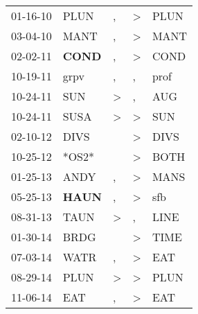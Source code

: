 \begin{supertabular}{p{0.07\textwidth}p{0.06\textwidth}p{0.02\textwidth}p{0.02\textwidth}p{0.06\textwidth}}
          01-16-10\textsuperscript{} &           PLUN\textsuperscript{} &             , &     \textgreater &           PLUN\textsuperscript{} \\
          03-04-10\textsuperscript{} &           MANT\textsuperscript{} &             , &     \textgreater &           MANT\textsuperscript{} \\
          02-02-11\textsuperscript{} &  \textbf{COND\textsuperscript{}} &             , &     \textgreater &           COND\textsuperscript{} \\
          10-19-11\textsuperscript{} &           grpv\textsuperscript{} &             , &                , &           prof\textsuperscript{} \\
          10-24-11\textsuperscript{} &            SUN\textsuperscript{} &  \textgreater &                , &            AUG\textsuperscript{} \\
          10-24-11\textsuperscript{} &           SUSA\textsuperscript{} &  \textgreater &     \textgreater &            SUN\textsuperscript{} \\
          02-10-12\textsuperscript{} &           DIVS\textsuperscript{} &               &     \textgreater &           DIVS\textsuperscript{} \\
          10-25-12\textsuperscript{} &                            *OS2* &               &     \textgreater &           BOTH\textsuperscript{} \\
          01-25-13\textsuperscript{} &           ANDY\textsuperscript{} &             , &     \textgreater &           MANS\textsuperscript{} \\
          05-25-13\textsuperscript{} &  \textbf{HAUN\textsuperscript{}} &             , &     \textgreater &            sfb\textsuperscript{} \\
          08-31-13\textsuperscript{} &           TAUN\textsuperscript{} &  \textgreater &                , &           LINE\textsuperscript{} \\
          01-30-14\textsuperscript{} &           BRDG\textsuperscript{} &               &     \textgreater &           TIME\textsuperscript{} \\
          07-03-14\textsuperscript{} &           WATR\textsuperscript{} &             , &     \textgreater &            EAT\textsuperscript{} \\
          08-29-14\textsuperscript{} &           PLUN\textsuperscript{} &  \textgreater &     \textgreater &           PLUN\textsuperscript{} \\
          11-06-14\textsuperscript{} &            EAT\textsuperscript{} &             , &     \textgreater &            EAT\textsuperscript{} \\

\end{supertabular}
